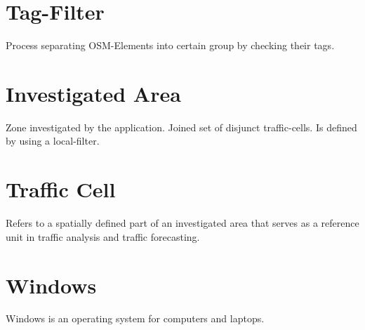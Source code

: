 \documentclass[letterpaper,10pt,english]{sphinxmanual}
\begin{document}
\section*{Tag-Filter}
Process separating OSM-Elements into certain group by checking their tags.

\section*{Investigated Area}
Zone investigated by the application. Joined set of disjunct traffic-cells. Is defined by using a local-filter.

\section*{Traffic Cell}
Refers to a spatially defined part of an investigated area that serves as a reference unit in traffic analysis and traffic forecasting.

\section*{Windows}
Windows is an operating system for computers and laptops.
\end{document}
